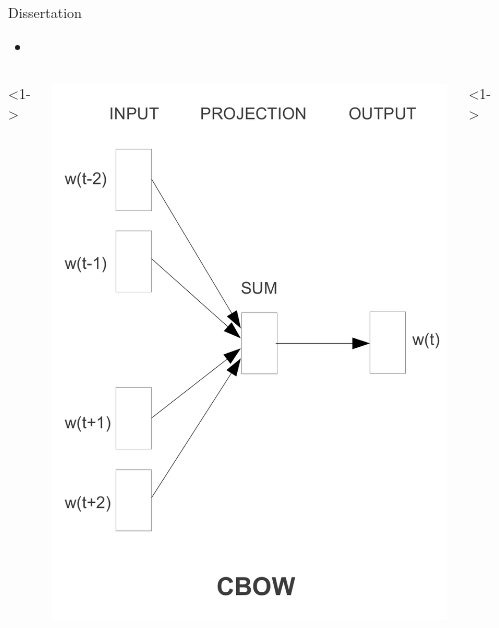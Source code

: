 \begin{xframe}{Dissertation}
    \begin{itemize}
        \item {}
    \end{itemize}


    \begin{columns}
        <1->
        \begin{center}
            \includegraphics[height=0.7\textheight]{./style/images/w2v_net.png}
        \end{center}
        <1->
        \begin{center}

\end{center}
\end{columns}
\end{xframe}
